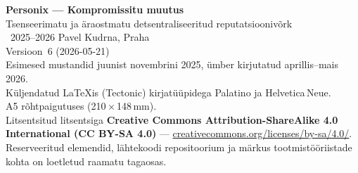 \thispagestyle{empty}
\ifdefined\printmode\vspace*{\fill}\else{}\fi
\begin{flushleft}\small\sffamily
\textbf{Personix --- Kompromissitu muutus}\\[0.3em]
Tsenseerimatu ja äraostmatu detsentraliseeritud reputatsioonivõrk\\[1.4em]

\textcopyright\ 2025--2026 Pavel Kudrna, Praha\\[0.4em]

Versioon~6 (2026-05-21)\\
Esimesed mustandid juunist novembrini 2025, ümber kirjutatud aprillis--mais 2026.\\[1.4em]

Küljendatud \LaTeX{}is (Tectonic) kirjatüüpidega Palatino ja Helvetica\,Neue.\\
A5 rõhtpaigutuses (210\,$\times$\,148\,mm).\\[1.4em]

Litsentsitud litsentsiga \textbf{Creative Commons Attribution-ShareAlike 4.0
International (CC BY-SA 4.0)} ---
\href{https://creativecommons.org/licenses/by-sa/4.0/}{creativecommons.org/licenses/by-sa/4.0/}.
Reserveeritud elemendid, lähtekoodi repositoorium ja märkus tootmistööriistade kohta
on loetletud raamatu tagaosas.
\end{flushleft}
\ifdefined\printmode\else{}\fi
\clearpage
